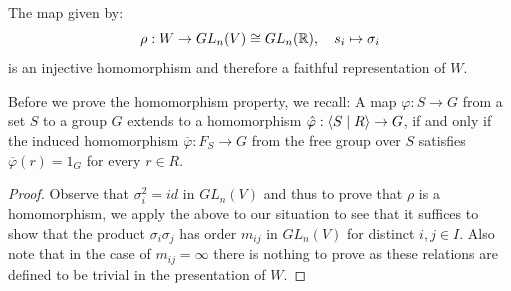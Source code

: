 \begin{theorem}\label{thm:repr}
    The map given by:
    \[\rho : W \to GL_n(V) \cong GL_n(\mathbb{R}), \quad s_i \mapsto \sigma_i\]
    is an injective homomorphism and therefore a faithful representation of \(W\).
\end{theorem}\noindent
Before we prove the homomorphism property, we recall:
A map \(\varphi: S\to G\) from a set \(S\) to a group \(G\) extends to a homomorphism \(\Hat{\varphi}:\langle S\;\vert\;R\rangle\to G\), if and only if the induced homomorphism \(\overline{\varphi}:F_S \to G\) from the free group over \(S\) satisfies \(\overline{\varphi}(r) = 1_G\) for every \(r\in R\).
\begin{proof}
    Observe that \(\sigma_i^2 = id\) in \(GL_n(V)\) and thus to prove that \(\rho\) is a homomorphism, we apply the above to our situation to see that it suffices to show that the product \(\sigma_i\sigma_j\) has order \(m_{ij}\) in \(GL_n(V)\) for distinct \(i,j\in I\).
    Also note that in the case of \(m_{ij} = \infty\) there is nothing to prove as these relations are defined to be trivial in the presentation of \(W\).
    

\end{proof}
